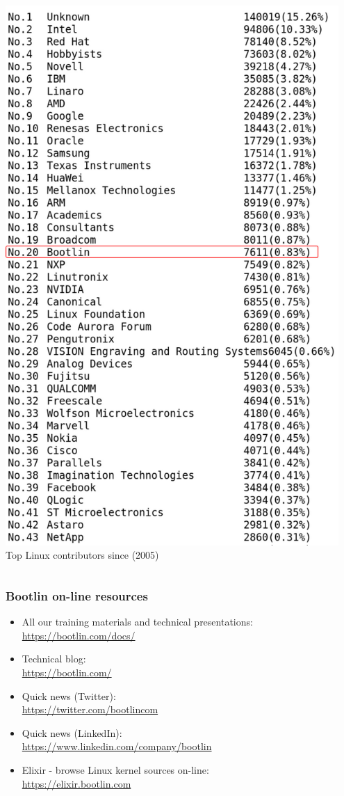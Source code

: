 \begin{frame}
\begin{columns}
  \includegraphics[width=0.95\textwidth]{slides/about-us/bootlin-kernel-contribs.jpg}\\
  \tiny Top Linux contributors since  (2005)
  \end{columns}
\end{frame}

\begin{frame}
\frametitle{Bootlin on-line resources}
\begin{itemize}
  \item All our training materials and technical presentations:\\
        \url{https://bootlin.com/docs/}
  \item Technical blog:\\
        \url{https://bootlin.com/}
  \item Quick news (Twitter):\\
        \url{https://twitter.com/bootlincom}
  \item Quick news (LinkedIn):\\
        \url{https://www.linkedin.com/company/bootlin}
  \item Elixir - browse Linux kernel sources on-line:\\
        \url{https://elixir.bootlin.com}
\end{itemize}
\end{frame}
